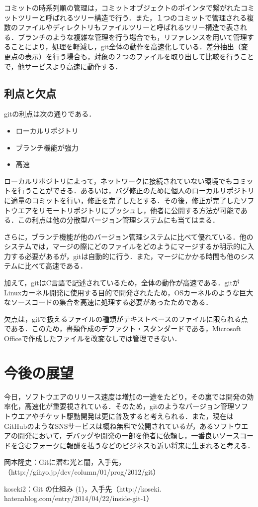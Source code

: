 \documentclass[a4j,9pt,twocolumn]{jsarticle}
\begin{document}
コミットの時系列順の管理は，コミットオブジェクトのポインタで繋がれたコミットツリーと呼ばれるツリー構造で行う．また，１つのコミットで管理される複数のファイルやディレクトリもファイルツリーと呼ばれるツリー構造で表される．ブランチのような複雑な管理を行う場合でも，リファレンスを用いて管理することにより，処理を軽減し，git全体の動作を高速化している．差分抽出（変更点の表示）を行う場合も，対象の２つのファイルを取り出して比較を行うことで，他サービスより高速に動作する．



\subsection{利点と欠点}
gitの利点は次の通りである．

\begin{itemize}
\item ローカルリポジトリ
\item ブランチ機能が強力
\item 高速
\end{itemize}

ローカルリポジトリによって，ネットワークに接続されていない環境でもコミットを行うことができる．あるいは，バグ修正のために個人のローカルリポジトリに適量のコミットを行い，修正を完了したとする．その後，修正が完了したソフトウエアをリモートリポジトリにプッシュし，他者に公開する方法が可能である．この利点は他の分散型バージョン管理システムにも当てはまる．

さらに，ブランチ機能が他のバージョン管理システムに比べて優れている．他のシステムでは，マージの際にどのファイルをどのようにマージするか明示的に入力する必要があるが，gitは自動的に行う．また，マージにかかる時間も他のシステムに比べて高速である．

加えて，gitはC言語で記述されているため，全体の動作が高速である．gitがLinuxカーネル開発に使用する目的で開発されたため，OSカーネルのような巨大なソースコードの集合を高速に処理する必要があったためである．

欠点は，gitで扱えるファイルの種類がテキストベースのファイルに限られる点である．このため，書類作成のデファクト・スタンダードである，Microsoft Officeで作成したファイルを改変なしでは管理できない．

\section{今後の展望}
今日，ソフトウエアのリリース速度は増加の一途をたどり，その裏では開発の効率化，高速化が重要視されている．そのため，gitのようなバージョン管理ソフトウエアやチケット駆動開発は更に普及すると考えられる．また，現在はGitHubのようなSNSサービスは概ね無料で公開されているが，あるソフトウエアの開発において，デバッグや開発の一部を他者に依頼し，一番良いソースコードを含むフォークに報酬を払うなどのビジネスも近い将来に生まれると考える．

\small
\begin{thebibliography}{99}
岡本隆史：Gitに潜む光と闇，入手先，（http://gihyo.jp/dev/column/01/prog/2012/git）

koseki2：Git の仕組み (1)，入手先（http://koseki.\\hatenablog.com/entry/2014/04/22/inside-git-1）
\end{thebibliography}
\end{document}

